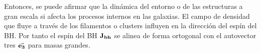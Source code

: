 Entonces, se puede afirmar que la dinámica del entorno o de las  estructuras a gran escala si afecta los procesos internos en las galaxias. El campo de densidad que fluye a través de los filamentos o clusters influyen en la dirección del espín del BH. Por tanto el espín del BH ${\bf{J_{bh}}}$ se alinea de forma ortogonal con el autovector tres $\vec{\bf{e}_3}$ para masas grandes. 
%

\begin{figure} 
\centering 
{} 

\end{figure}
